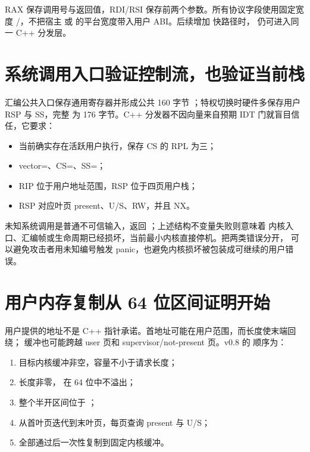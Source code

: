 RAX 保存调用号与返回值，RDI/RSI 保存前两个参数。所有协议字段使用固定宽度
/，不把宿主  或
 的平台宽度带入用户 ABI。后续增加  快路径时，
仍可进入同一 C++ 分发层。

\section{系统调用入口验证控制流，也验证当前栈}

汇编公共入口保存通用寄存器并形成公共 160 字节
；特权切换时硬件多保存用户 RSP 与 SS，完整
 为 176 字节。C++ 分发器不因向量来自预期 IDT
门就盲目信任，它要求：

\begin{itemize}
  \item 当前确实存在活跃用户执行，保存 CS 的 RPL 为三；
  \item vector=、CS=、SS=；
  \item RIP 位于用户地址范围，RSP 位于四页用户栈；
  \item RSP 对应叶页 present、U/S、RW，并且 NX。
\end{itemize}

未知系统调用是普通不可信输入，返回 ；上述结构不变量失败则意味着
内核入口、汇编帧或生命周期已经损坏，当前最小内核直接停机。把两类错误分开，
可以避免攻击者用未知编号触发 panic，也避免内核损坏被包装成可继续的用户错误。

\section{用户内存复制从 64 位区间证明开始}

用户提供的地址不是 C++ 指针承诺。首地址可能在用户范围，而长度使末端回绕；
缓冲也可能跨越 user 页和 supervisor/not-present 页。v0.8 的
 顺序为：

\begin{enumerate}
  \item 目标内核缓冲非空，容量不小于请求长度；
  \item 长度非零， 在 64 位中不溢出；
  \item 整个半开区间位于
        ；
  \item 从首叶页迭代到末叶页，每页查询 present 与 U/S；
  \item 全部通过后一次性复制到固定内核缓冲。
\end{enumerate}

